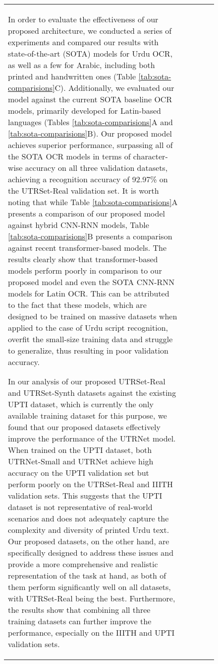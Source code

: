 \documentclass[runningheads]{llncs}
\newcommand{\ModelName}{{UTRNet}\xspace}
\newcommand{\DatasetNameReal}{{UTRSet-Real}\xspace}
\newcommand{\DatasetNameSynth}{{UTRSet-Synth}\xspace}
\begin{document}
\begin{figure}[t]
\begin{tabular}{lcccc}
In order to evaluate the effectiveness of our proposed architecture, we conducted a series of experiments and compared our results with state-of-the-art (SOTA) models for Urdu OCR, as well as a few for Arabic, including both printed and handwritten ones (Table \ref{tab:sota-comparisions}C). Additionally, we evaluated our model against the current SOTA baseline OCR models, primarily developed for Latin-based languages (Tables \ref{tab:sota-comparisions}A and \ref{tab:sota-comparisions}B). Our proposed model achieves superior performance, surpassing all of the SOTA OCR models in terms of character-wise accuracy on all three validation datasets, achieving a recognition accuracy of 92.97\% on the \DatasetNameReal validation set. It is worth noting that while Table \ref{tab:sota-comparisions}A presents a comparison of our proposed model against hybrid CNN-RNN models, Table \ref{tab:sota-comparisions}B presents a comparison against recent transformer-based models. The results clearly show that transformer-based models perform poorly in comparison to our proposed model and even the SOTA CNN-RNN models for Latin OCR. This can be attributed to the fact that these models, which are designed to be trained on massive datasets when applied to the case of Urdu script recognition, overfit the small-size training data and struggle to generalize, thus resulting in poor validation accuracy.

In our analysis of our proposed \DatasetNameReal and \DatasetNameSynth datasets against the existing UPTI dataset, which is currently the only available training dataset for this purpose, we found that our proposed datasets effectively improve the performance of the \ModelName model. When trained on the UPTI dataset, both \ModelName-Small and \ModelName achieve high accuracy on the UPTI validation set but perform poorly on the UTRSet-Real and IIITH validation sets. This suggests that the UPTI dataset is not representative of real-world scenarios and does not adequately capture the complexity and diversity of printed Urdu text. Our proposed datasets, on the other hand, are specifically designed to address these issues and provide a more comprehensive and realistic representation of the task at hand, as both of them perform significantly well on all datasets, with \DatasetNameReal being the best. Furthermore, the results show that combining all three training datasets can further improve the performance, especially on the IIITH and UPTI validation sets.


\end{tabular}
\end{figure}
\end{document}
